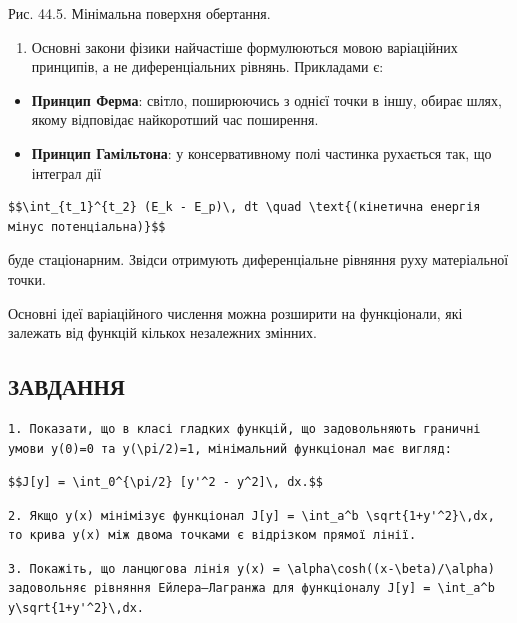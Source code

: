 \documentclass[
  ukrainian,
]{article}
\providecommand{\tightlist}{%
  \setlength{\itemsep}{0pt}\setlength{\parskip}{0pt}}
\begin{document}
Рис. 44.5. Мінімальна поверхня обертання.

\begin{enumerate}
\def\labelenumi{\arabic{enumi}.}
\setcounter{enumi}{3}
\tightlist
\item
  Основні закони фізики найчастіше формулюються мовою варіаційних
  принципів, а не диференціальних рівнянь. Прикладами є:
\end{enumerate}

\begin{itemize}
\item
  \textbf{Принцип Ферма}: світло, поширюючись з однієї точки в іншу,
  обирає шлях, якому відповідає найкоротший час поширення.
\item
  \textbf{Принцип Гамільтона}: у консервативному полі частинка рухається
  так, що інтеграл дії
\end{itemize}

\begin{verbatim}
$$\int_{t_1}^{t_2} (E_k - E_p)\, dt \quad \text{(кінетична енергія мінус потенціальна)}$$
\end{verbatim}

буде стаціонарним. Звідси отримують диференціальне рівняння руху
матеріальної точки.

Основні ідеї варіаційного числення можна розширити на функціонали, які
залежать від функцій кількох незалежних змінних.

\subsection{ЗАВДАННЯ}\label{ux437ux430ux432ux434ux430ux43dux43dux44f-24}

\begin{verbatim}
1. Показати, що в класі гладких функцій, що задовольняють граничні умови y(0)=0 та y(\pi/2)=1, мінімальний функціонал має вигляд:
\end{verbatim}

\begin{verbatim}
$$J[y] = \int_0^{\pi/2} [y'^2 - y^2]\, dx.$$
\end{verbatim}

\begin{verbatim}
2. Якщо y(x) мінімізує функціонал J[y] = \int_a^b \sqrt{1+y'^2}\,dx, то крива y(x) між двома точками є відрізком прямої лінії.
\end{verbatim}

\begin{verbatim}
3. Покажіть, що ланцюгова лінія y(x) = \alpha\cosh((x-\beta)/\alpha) задовольняє рівняння Ейлера–Лагранжа для функціоналу J[y] = \int_a^b y\sqrt{1+y'^2}\,dx.
\end{verbatim}
\end{document}
